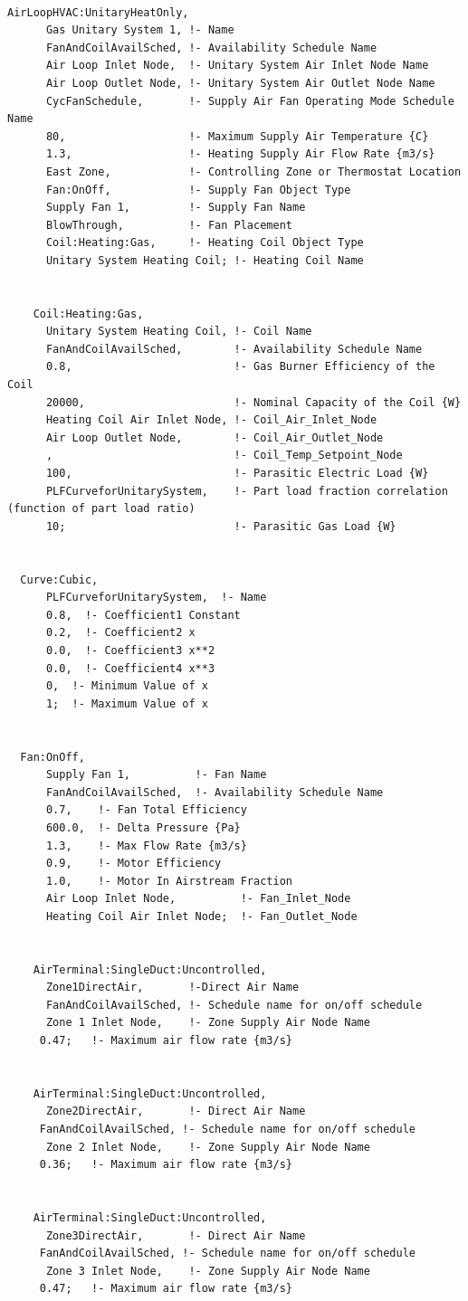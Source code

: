 \begin{lstlisting}

AirLoopHVAC:UnitaryHeatOnly,
      Gas Unitary System 1, !- Name
      FanAndCoilAvailSched, !- Availability Schedule Name
      Air Loop Inlet Node,  !- Unitary System Air Inlet Node Name
      Air Loop Outlet Node, !- Unitary System Air Outlet Node Name
      CycFanSchedule,       !- Supply Air Fan Operating Mode Schedule Name
      80,                   !- Maximum Supply Air Temperature {C}
      1.3,                  !- Heating Supply Air Flow Rate {m3/s}
      East Zone,            !- Controlling Zone or Thermostat Location
      Fan:OnOff,            !- Supply Fan Object Type
      Supply Fan 1,         !- Supply Fan Name
      BlowThrough,          !- Fan Placement
      Coil:Heating:Gas,     !- Heating Coil Object Type
      Unitary System Heating Coil; !- Heating Coil Name


    Coil:Heating:Gas,
      Unitary System Heating Coil, !- Coil Name
      FanAndCoilAvailSched,        !- Availability Schedule Name
      0.8,                         !- Gas Burner Efficiency of the Coil
      20000,                       !- Nominal Capacity of the Coil {W}
      Heating Coil Air Inlet Node, !- Coil_Air_Inlet_Node
      Air Loop Outlet Node,        !- Coil_Air_Outlet_Node
      ,                            !- Coil_Temp_Setpoint_Node
      100,                         !- Parasitic Electric Load {W}
      PLFCurveforUnitarySystem,    !- Part load fraction correlation (function of part load ratio)
      10;                          !- Parasitic Gas Load {W}


  Curve:Cubic,
      PLFCurveforUnitarySystem,  !- Name
      0.8,  !- Coefficient1 Constant
      0.2,  !- Coefficient2 x
      0.0,  !- Coefficient3 x**2
      0.0,  !- Coefficient4 x**3
      0,  !- Minimum Value of x
      1;  !- Maximum Value of x


  Fan:OnOff,
      Supply Fan 1,          !- Fan Name
      FanAndCoilAvailSched,  !- Availability Schedule Name
      0.7,    !- Fan Total Efficiency
      600.0,  !- Delta Pressure {Pa}
      1.3,    !- Max Flow Rate {m3/s}
      0.9,    !- Motor Efficiency
      1.0,    !- Motor In Airstream Fraction
      Air Loop Inlet Node,          !- Fan_Inlet_Node
      Heating Coil Air Inlet Node;  !- Fan_Outlet_Node


    AirTerminal:SingleDuct:Uncontrolled,
      Zone1DirectAir,       !-Direct Air Name
      FanAndCoilAvailSched, !- Schedule name for on/off schedule
      Zone 1 Inlet Node,    !- Zone Supply Air Node Name
     0.47;   !- Maximum air flow rate {m3/s}


    AirTerminal:SingleDuct:Uncontrolled,
      Zone2DirectAir,       !- Direct Air Name
     FanAndCoilAvailSched, !- Schedule name for on/off schedule
      Zone 2 Inlet Node,    !- Zone Supply Air Node Name
     0.36;   !- Maximum air flow rate {m3/s}


    AirTerminal:SingleDuct:Uncontrolled,
      Zone3DirectAir,       !- Direct Air Name
     FanAndCoilAvailSched, !- Schedule name for on/off schedule
      Zone 3 Inlet Node,    !- Zone Supply Air Node Name
     0.47;   !- Maximum air flow rate {m3/s}
\end{lstlisting}

